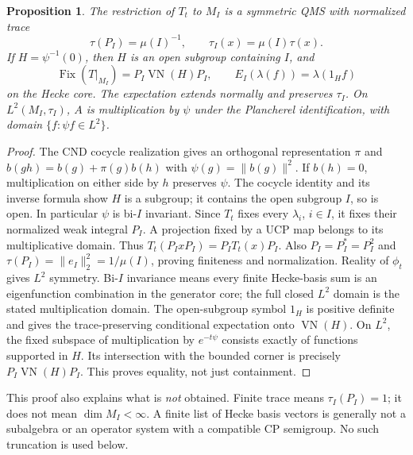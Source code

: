 \documentclass[11pt]{article}
\newtheorem{proposition}[definition]{Proposition}
\theoremstyle{remark}\newtheorem{remark}[definition]{Remark}
\newcommand{\VN}{\operatorname{VN}}
\newcommand{\Fix}{\operatorname{Fix}}
\begin{document}
\begin{proposition}\label{prop:corner}
The restriction of $T_t$ to $M_I$ is a symmetric QMS with normalized trace
\[
 \tau(P_I)=\mu(I)^{-1},\qquad \tau_I(x)=\mu(I)\tau(x).
\]
If $H=\psi^{-1}(0)$, then $H$ is an open subgroup containing $I$, and
\[
 \Fix(T|_{M_I})=P_I\VN(H)P_I,\qquad
 E_I(\lambda(f))=\lambda(1_H f)
\]
on the Hecke core. The expectation extends normally and preserves $\tau_I$.
On $L^2(M_I,\tau_I)$, $A$ is multiplication by $\psi$ under the Plancherel
identification, with domain $\{f:\psi f\in L^2\}$.
\end{proposition}
\begin{proof}
The CND cocycle realization gives an orthogonal representation $\pi$ and
$b(gh)=b(g)+\pi(g)b(h)$ with $\psi(g)=\|b(g)\|^2$.
If $b(h)=0$, multiplication on either side by $h$ preserves $\psi$.
The cocycle identity and its inverse formula show $H$ is a subgroup;
it contains the open subgroup $I$, so is open. In particular $\psi$ is
bi-$I$ invariant.
Since $T_t$ fixes every $\lambda_i$, $i\in I$, it fixes their normalized
weak integral $P_I$. A projection fixed by a UCP map belongs to its
multiplicative domain. Thus
$T_t(P_IxP_I)=P_IT_t(x)P_I$.
Also $P_I=P_I^*=P_I^2$ and
$\tau(P_I)=\|e_I\|_2^2=1/\mu(I)$, proving finiteness and normalization.
Reality of $\phi_t$ gives $L^2$ symmetry. Bi-$I$ invariance means every
finite Hecke-basis sum is an eigenfunction combination in the generator
core; the full closed $L^2$ domain is the stated multiplication domain.
The open-subgroup symbol $1_H$ is positive definite and gives the
trace-preserving conditional expectation onto $\VN(H)$. On $L^2$, the
fixed subspace of multiplication by $e^{-t\psi}$ consists exactly of
functions supported in $H$. Its intersection with the bounded corner
is precisely $P_I\VN(H)P_I$. This proves equality, not just containment.
\end{proof}

This proof also explains what is \emph{not} obtained. Finite trace means
$\tau_I(P_I)=1$; it does not mean $\dim M_I<\infty$. A finite list of
Hecke basis vectors is generally not a subalgebra or an operator system
with a compatible CP semigroup. No such truncation is used below.
\end{document}
